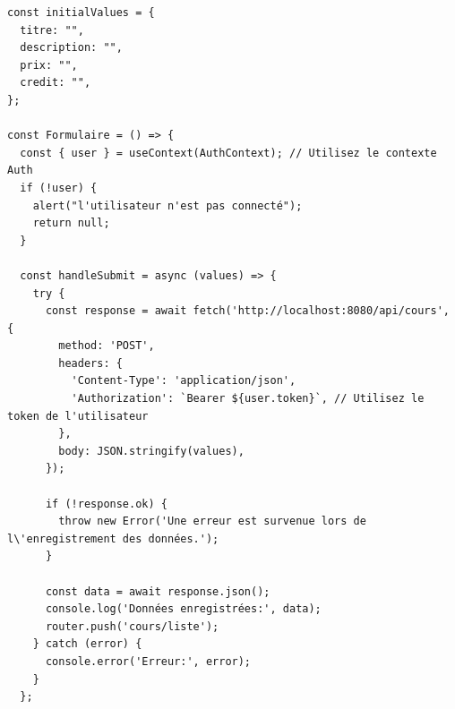 \documentclass[5pt]{beamer}
\begin{document}
{\begin{verbatim}
const initialValues = {
  titre: "",
  description: "",
  prix: "",
  credit: "",
};

const Formulaire = () => {
  const { user } = useContext(AuthContext); // Utilisez le contexte Auth
  if (!user) {
    alert("l'utilisateur n'est pas connecté");
    return null;
  }

  const handleSubmit = async (values) => {
    try {
      const response = await fetch('http://localhost:8080/api/cours', {
        method: 'POST',
        headers: {
          'Content-Type': 'application/json',
          'Authorization': `Bearer ${user.token}`, // Utilisez le token de l'utilisateur
        },
        body: JSON.stringify(values),
      });

      if (!response.ok) {
        throw new Error('Une erreur est survenue lors de l\'enregistrement des données.');
      }

      const data = await response.json();
      console.log('Données enregistrées:', data);
      router.push('cours/liste');
    } catch (error) {
      console.error('Erreur:', error);
    }
  };


\end{verbatim}}
\end{document}
